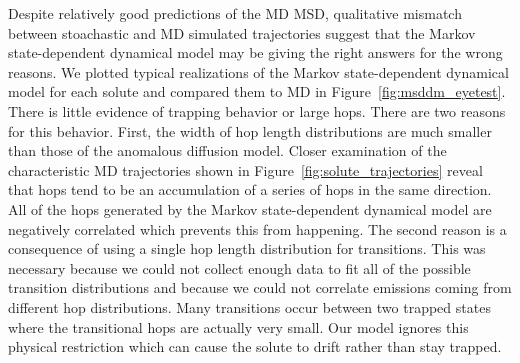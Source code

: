 \documentclass[journal=jctcce,manuscript=article]{achemso}
\begin{document}
  Despite relatively good predictions of the MD MSD, qualitative mismatch
  between stoachastic and MD simulated trajectories suggest that the Markov
  state-dependent dynamical model may be giving the right answers for the
  wrong reasons. We plotted typical realizations of the Markov state-dependent
  dynamical model for each solute and compared them to MD in 
  Figure~\ref{fig:msddm_eyetest}. There is little evidence of trapping behavior
  or large hops. There are two reasons for this behavior. First, the width of
  hop length distributions are much smaller than those of the anomalous diffusion
  model. Closer examination of the characteristic MD trajectories shown in
  Figure~\ref{fig:solute_trajectories} reveal that hops tend to be an
  accumulation of a series of hops in the same direction. All of the hops generated
  by the Markov state-dependent dynamical model are negatively correlated which
  prevents this from happening. The second reason is a consequence of using a 
  single hop length distribution for transitions. This was necessary because we 
  could not collect enough data to fit all of the possible transition distributions
  and because we could not correlate emissions coming from different hop 
  distributions. Many transitions occur between two trapped states where the 
  transitional hops are actually very small. Our model ignores this physical 
  restriction which can cause the solute to drift rather than stay trapped.
  
\end{document}
